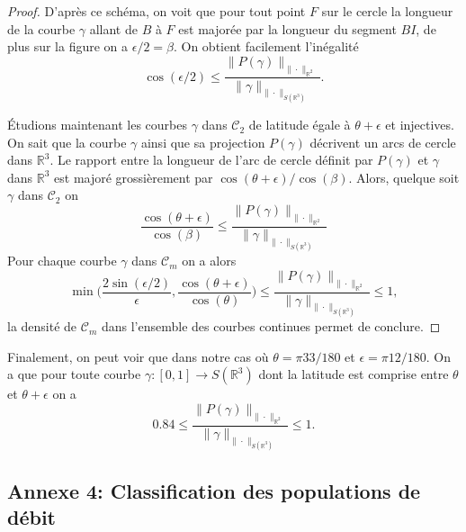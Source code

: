 \documentclass[a4paper,11pt]{article}
\numberwithin{equation}{section}
\begin{document}
\begin{proof}
D'après ce schéma, on voit que pour tout point $F$ sur le cercle la longueur de la courbe $\gamma$ allant de $B$ à $F$  est majorée par la longueur du segment $BI$, de plus sur la figure  on a $\epsilon/2=\beta$. On obtient facilement l'inégalité
\[\cos(\epsilon/2)\leq\frac{\|P(\gamma)\|_{\|\cdot\|_{\mathbb{R}^2}}}{\|\gamma\|_{\|\cdot\|_{S(\mathbb{R}^3)}}}.\]
	
Étudions maintenant les courbes $\gamma$ dans $\mathcal{C}_2$ de latitude égale à $\theta+\epsilon$ et injectives. On sait que la courbe $\gamma$ ainsi que sa projection $P(\gamma)$ décrivent un arcs de cercle dans $\mathbb{R}^3$. Le rapport entre la longueur de l'arc de cercle définit par $P(\gamma)$ et $\gamma$ dans $\mathbb{R}^3$ est majoré grossièrement par $\cos(\theta+\epsilon)/\cos(\beta)$. Alors, quelque soit $\gamma$ dans $\mathcal{C}_2$ on
\[\frac{\cos(\theta+\epsilon)}{\cos(\beta)}\leq\frac{\|P(\gamma)\|_{\|\cdot\|_{\mathbb{R}^2}}}{\|\gamma\|_{\|\cdot\|_{S(\mathbb{R}^3)}}}\]
Pour chaque courbe $\gamma$ dans $\mathcal{C}_m$ on a alors 
\[\min\Big(\frac{2\sin(\epsilon/2)}{\epsilon},\frac{\cos(\theta+\epsilon)}{\cos(\theta)} \Big)\leq \frac{\|P(\gamma)\|_{\|\cdot\|_{\mathbb{R}^2}}}{\|\gamma\|_{\|\cdot\|_{S(\mathbb{R}^3)}}} \leq 1,\]
la densité de $\mathcal{C}_m$ dans l'ensemble des courbes continues permet de conclure.
\end{proof}

Finalement, on peut voir que dans notre cas où $\theta=\pi 33/180$ et $\epsilon=\pi 12/180$. On a que pour toute courbe $\gamma:[0,1]\to S(\mathbb{R}^3)$ dont la latitude est comprise entre $\theta$ et $\theta+\epsilon$ on a
\[0.84\leq \frac{\|P(\gamma)\|_{\|\cdot\|_{\mathbb{R}^2}}}{\|\gamma\|_{\|\cdot\|_{S(\mathbb{R}^3)}}} \leq 1.\]


\subsection{Annexe 4: Classification des populations de débit}
\label{indexe3:cl_deb}
\end{document}
